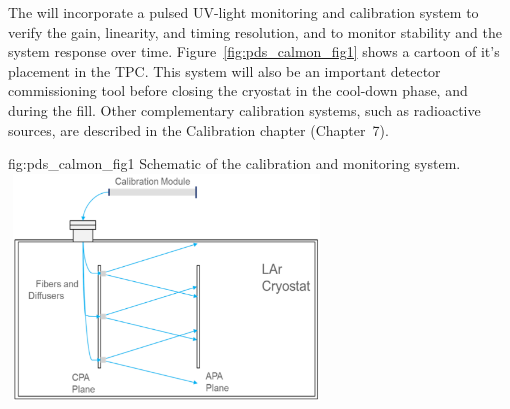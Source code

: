 

The  will incorporate a  pulsed UV-light monitoring and calibration system %
to verify the  gain, linearity, and timing resolution, and to monitor stability and the system response over time.  Figure~\ref{fig:pds_calmon_fig1} shows a cartoon of it's  placement in the TPC. This system will also be an important detector commissioning tool before closing the cryostat  
in the cool-down phase, and during the \lar fill.
Other complementary calibration systems, such as radioactive sources, are described in the  Calibration chapter (Chapter~7). 


\begin{dunefigure}
 {fig:pds_calmon_fig1}
 {Schematic of the   calibration and monitoring system.}
\includegraphics[angle=0,width=8.4cm,height=6cm]{graphics/pds-calmon-fig1-old.png}
\end{dunefigure}

